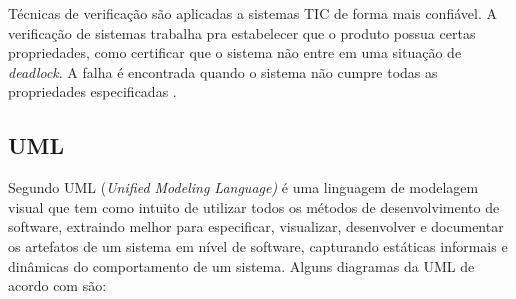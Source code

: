 Técnicas de verificação são aplicadas a sistemas TIC de forma mais confiável. A verificação de sistemas trabalha pra estabelecer que o produto possua certas propriedades, como certificar que o sistema não entre em uma situação de \textit{deadlock}. A falha é encontrada quando o sistema não cumpre todas as propriedades especificadas \cite{Baier:2008}.



\subsection{UML}

Segundo  UML (\textit{Unified Modeling Language)} é uma linguagem de modelagem visual que tem como intuito de utilizar todos os métodos de desenvolvimento de software, extraindo melhor para especificar, visualizar, desenvolver e documentar os artefatos de um sistema em nível de software, capturando estáticas informais e dinâmicas do comportamento de um sistema. Alguns diagramas da UML de acordo com  são:

